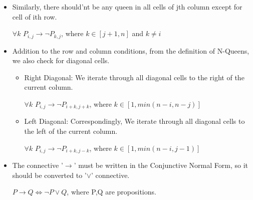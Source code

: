 \documentclass{article}
\begin{document}
\begin{itemize}
    \item Similarly, there should'nt be any queen in all cells of jth column except for cell of ith row.
    \begin{center} $\forall k$ $ P_{i,j} \rightarrow \neg P_{k,j}$, where $k \in [j+1,n]$ and $k \neq i$
    \end{center}
    \item Addition to the row and column conditions, from the definition of N-Queens, we also check for diagonal cells.
    \begin{itemize}
        \item Right Diagonal: We iterate through all diagonal cells to the right of the current column.
        \begin{center}$\forall k$ $ P_{i,j} \rightarrow \neg P_{i+k,j+k}$, where $k \in [1, min(n-i,n-j)]$
        \end{center}
        \item Left Diagonal: Correspondingly, We iterate through all diagonal cells to the left of the current column.
        \begin{center}$\forall k$ $ P_{i,j} \rightarrow \neg P_{i+k,j-k}$, where $k \in [1, min(n-i,j-1)]$
        \end{center}
    \end{itemize}
    \item The connective '$\rightarrow$' must be written in the Conjunctive Normal Form, so it should be converted to '$\lor$' connective.
    \begin{center}
        $P \rightarrow Q \Leftrightarrow \neg P \lor Q $,  where P,Q are propositions.  
    \end{center}
\end{itemize}
\end{document}
